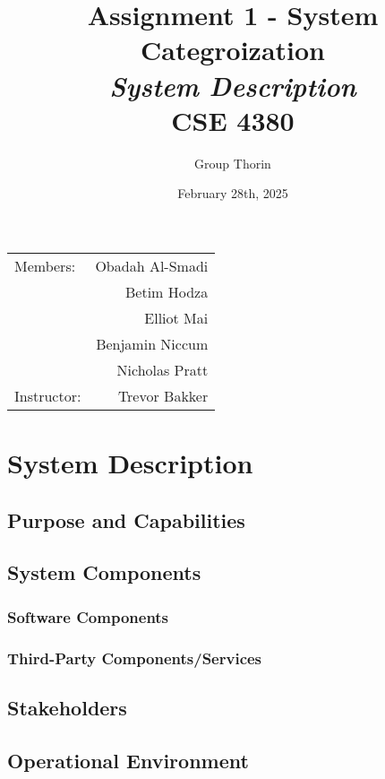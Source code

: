 \documentclass{article}
\title{Assignment 1 - System Categroization \\ \textit{System Description}\\ CSE 4380}
\author{Group Thorin}
\date{February 28th, 2025}
\begin{document}
\maketitle
\begin{center}
\begin{tabular}{l r}

Members: 	& Obadah Al-Smadi\\
			& Betim Hodza\\
			& Elliot Mai\\
			& Benjamin Niccum\\
        	& Nicholas Pratt\\
Instructor: & Trevor Bakker\end{tabular}
\end{center}

\newpage

\setcounter{tocdepth}{2}
\tableofcontents
\newpage


\section{System Description}


\subsection{Purpose and Capabilities}


\subsection{System Components}


\subsubsection{Software Components}


\subsubsection{Third-Party Components/Services}


\subsection{Stakeholders}


\subsection{Operational Environment}

\end{document}
